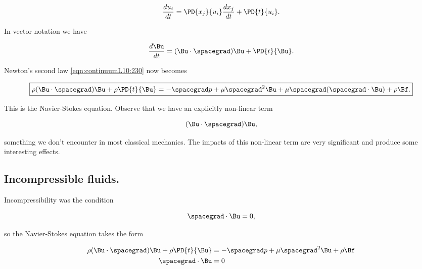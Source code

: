 \begin{equation}\label{eqn:continuumL10:270}
\frac{du_i}{dt} = \PD{x_j}{u_i} \frac{dx_j}{dt} + \PD{t}{u_i} .
\end{equation}

In vector notation we have

\begin{equation}\label{eqn:continuumL10:290}
\frac{d\Bu}{dt} = (\Bu \cdot \spacegrad) \Bu + \PD{t}{\Bu}.
\end{equation}

Newton's second law \ref{eqn:continuumL10:230} now becomes

\begin{equation}\label{eqn:continuumL10:230b}
\boxed{
\rho 
 (\Bu \cdot \spacegrad) \Bu + \rho \PD{t}{\Bu} 
= -\spacegrad p + \mu \spacegrad^2 \Bu 
+ \mu \spacegrad (\spacegrad \cdot \Bu) + \rho \Bf.
}
\end{equation}

This is the Navier-Stokes equation.  Observe that we have an explicitly non-linear term

\begin{equation}\label{eqn:continuumL10:310}
(\Bu \cdot \spacegrad) \Bu ,
\end{equation}

something we don't encounter in most classical mechanics.  The impacts of this non-linear term are very significant and produce some interesting effects.

\subsection{Incompressible fluids.}

Incompressibility was the condition

\begin{equation}\label{eqn:continuumL10:330}
\spacegrad \cdot \Bu = 0,
\end{equation}

so the Navier-Stokes equation takes the form

\begin{equation}\label{eqn:continuumL10:230b}
\begin{aligned}
\rho 
 (\Bu \cdot \spacegrad) \Bu + \rho \PD{t}{\Bu} 
&= -\spacegrad p + \mu \spacegrad^2 \Bu 
+ \rho \Bf \\
\spacegrad \cdot \Bu &= 0
\end{aligned}
\end{equation}

